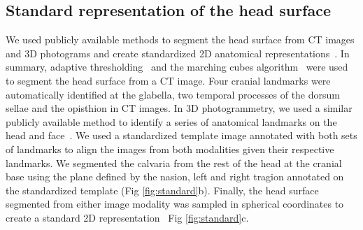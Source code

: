 \documentclass[conference]{IEEEtran}
\begin{document}
\subsection{Standard representation of the head surface}
We used publicly available methods to segment the head surface from CT images and 3D photograms and create standardized 2D anatomical representations~\cite{Porras2022Predictive}. In summary, adaptive thresholding~\cite{Liu2022Data-driven} and the marching cubes algorithm~\cite{Lorensen1987Marching} were used to segment the head surface from a CT image. Four cranial landmarks were automatically identified at the glabella, two temporal processes of the dorsum sellae and the opisthion in CT images. In 3D photogrammetry, we used a similar publicly available method to identify a series of anatomical landmarks on the head and face~\cite{Elkhill2023Geometric}. We used a standardized template image annotated with both sets of landmarks to align the images from both modalities given their respective landmarks. We segmented the calvaria from the rest of the head at the cranial base using the plane defined by the nasion, left and right tragion annotated on the standardized template (Fig \ref{fig:standard}b). Finally, the head surface segmented from either image modality was sampled in spherical coordinates to create a standard 2D representation~\cite{Porras2022Predictive} Fig \ref{fig:standard}c.
\end{document}
